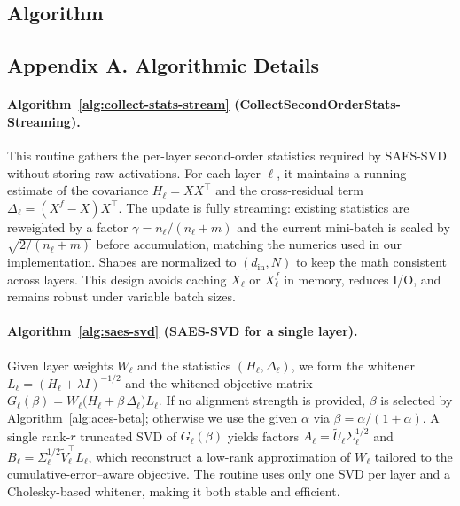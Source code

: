 


\newpage
\subsection{Algorithm}\label{appendix:algorithm}
\subsection*{Appendix A. Algorithmic Details}

\paragraph{Algorithm~\ref{alg:collect-stats-stream} (CollectSecondOrderStats-Streaming).}
This routine gathers the per-layer second-order statistics required by SAES-SVD without storing raw activations. For each layer $\ell$, it maintains a running estimate of the covariance $H_\ell = XX^\top$ and the cross-residual term $\Delta_\ell = (X^f - X)X^\top$. The update is fully streaming: existing statistics are reweighted by a factor $\gamma = n_\ell/(n_\ell + m)$ and the current mini-batch is scaled by $\sqrt{2/(n_\ell + m)}$ before accumulation, matching the numerics used in our implementation. Shapes are normalized to $(d_{\text{in}}, N)$ to keep the math consistent across layers. This design avoids caching $X_\ell$ or $X^f_\ell$ in memory, reduces I/O, and remains robust under variable batch sizes.

\paragraph{Algorithm~\ref{alg:saes-svd} (SAES-SVD for a single layer).}
Given layer weights $W_\ell$ and the statistics $(H_\ell,\Delta_\ell)$, we form the whitener $L_\ell = (H_\ell+\lambda I)^{-1/2}$ and the whitened objective matrix
\(
G_\ell(\beta)=W_\ell\big(H_\ell+\beta\,\Delta_\ell\big)L_\ell.
\)
If no alignment strength is provided, $\beta$ is selected by Algorithm~\ref{alg:aces-beta}; otherwise we use the given $\alpha$ via $\beta=\alpha/(1+\alpha)$. A single rank-$r$ truncated SVD of $G_\ell(\beta)$ yields factors $A_\ell=\tilde U_\ell\Sigma_\ell^{1/2}$ and $B_\ell=\Sigma_\ell^{1/2}\tilde V_\ell^\top L_\ell$, which reconstruct a low-rank approximation of $W_\ell$ tailored to the cumulative-error–aware objective. The routine uses only one SVD per layer and a Cholesky-based whitener, making it both stable and efficient.

